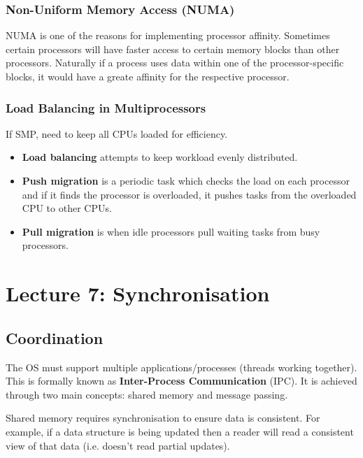 \documentclass{article}%
\begin{document}
\subsubsection{Non-Uniform Memory Access (NUMA)}
NUMA is one of the reasons for implementing processor affinity.
Sometimes certain processors will have faster access to certain memory blocks than other processors. 
Naturally if a process uses data within one of the processor-specific blocks, it would have a greate affinity for the respective processor.

\subsubsection{Load Balancing in Multiprocessors}
If SMP, need to keep all CPUs loaded for efficiency.

\begin{itemize}
	\item \textbf{Load balancing} attempts to keep workload evenly distributed.
	\item \textbf{Push migration} is a periodic task which checks the load on each processor and if it finds the processor is overloaded, it pushes tasks from the overloaded CPU to other CPUs.
	\item \textbf{Pull migration} is when idle processors pull waiting tasks from busy processors.
\end{itemize}




\maketitle
\section{Lecture 7: Synchronisation}


\subsection{Coordination}
\label{sec:org991f479}
The OS must support multiple applications/processes (threads working together).
This is formally known as \textbf{Inter-Process Communication} (IPC).
It is achieved through two main concepts: shared memory and message passing.

Shared memory requires synchronisation to ensure data is consistent.
For example, if a data structure is being updated then a reader will read a consistent view of that data (i.e. doesn't read partial updates).
\end{document}
